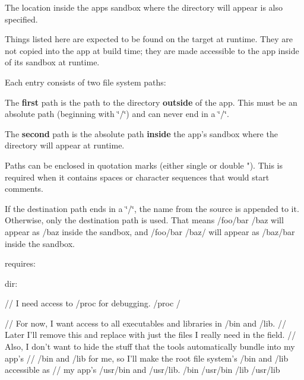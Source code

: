 The location inside the app\textquotesingle{}s sandbox where the directory will appear is also specified.

Things listed here are expected to be found on the target at runtime. They are not copied into the app at build time; they are made accessible to the app inside of its sandbox at runtime.

Each entry consists of two file system paths\+:


\begin{DoxyItemize}
\item The {\bfseries first} path is the path to the directory {\bfseries outside} of the app. This must be an absolute path (beginning with \char`\"{}/\char`\"{}) and can never end in a \char`\"{}/\char`\"{}.
\item The {\bfseries second} path is the absolute path {\bfseries inside} the app’s sandbox where the directory will appear at runtime.
\end{DoxyItemize}

Paths can be enclosed in quotation marks (either single \textquotesingle{} or double "). This is required when it contains spaces or character sequences that would start comments.

If the destination path ends in a \char`\"{}/\char`\"{}, the name from the source is appended to it. Otherwise, only the destination path is used. That means {\ttfamily /foo/bar} /baz will appear as {\ttfamily /baz} inside the sandbox, and {\ttfamily /foo/bar} /baz/ will appear as {\ttfamily /baz/bar} inside the sandbox.

\begin{DoxyVerb}requires:
{
    dir:
    {
        // I need access to /proc for debugging.
        /proc   /

        // For now, I want access to all executables and libraries in /bin and /lib.
        // Later I'll remove this and replace with just the files I really need in the field.
        // Also, I don't want to hide the stuff that the tools automatically bundle into my app's
        // /bin and /lib for me, so I'll make the root file system's /bin and /lib accessible as
        // my app's /usr/bin and /usr/lib.
        /bin    /usr/bin
        /lib    /usr/lib
    }
}
\end{DoxyVerb}


